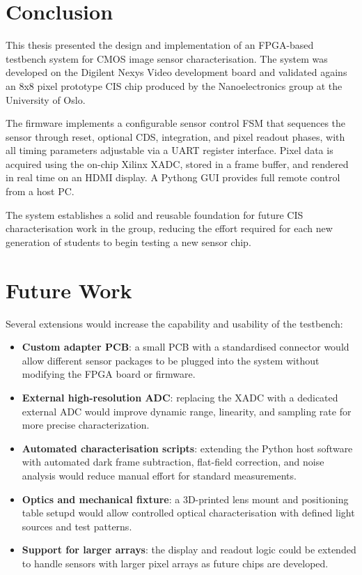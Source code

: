 
\section{Conclusion}

This thesis presented the design and implementation of an FPGA-based testbench system for CMOS image sensor characterisation. The system was developed on the Digilent Nexys Video development board and validated agains an 8x8 pixel prototype CIS chip produced by the Nanoelectronics group at the University of Oslo.

The firmware implements a configurable sensor control FSM that sequences the sensor through reset, optional CDS, integration, and pixel readout phases, with all timing parameters adjustable via a UART register interface. Pixel data is acquired using the on-chip Xilinx XADC, stored in a frame buffer, and rendered in real time on an HDMI display. A Pythong GUI provides full remote control from a host PC.


The system establishes a solid and reusable foundation for future CIS characterisation work in the group, reducing the effort required for each new generation of students to begin testing a new sensor chip.

\section{Future Work}

Several extensions would increase the capability and usability of the testbench:

\begin{itemize}
    \item \textbf{Custom adapter PCB}: a small PCB with a standardised connector would allow different sensor packages to be plugged into the system without modifying the FPGA board or firmware.

    \item \textbf{External high-resolution ADC}: replacing the XADC with a dedicated external ADC would improve dynamic range, linearity, and sampling rate for more precise characterization.

    \item \textbf{Automated characterisation scripts}: extending the Python host software with automated dark frame subtraction, flat-field correction, and noise analysis would reduce manual effort for standard measurements.

    \item \textbf{Optics and mechanical fixture}: a 3D-printed lens mount and positioning table setupd would allow controlled optical characterisation with defined light sources and test patterns.

    \item \textbf{Support for larger arrays}: the display and readout logic could be extended to handle sensors with larger pixel arrays as future chips are developed.
\end{itemize}